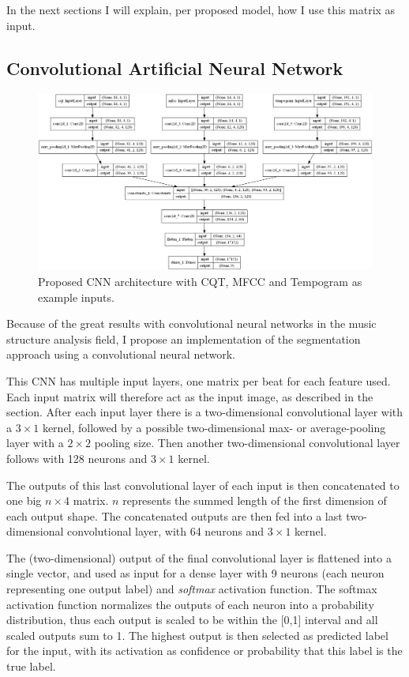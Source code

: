 In the next sections I will explain, per proposed model, how I use this matrix as input.

\subsection[CNN]{Convolutional Artificial Neural Network}
\begin{figure}[t]
    \centering
    \includegraphics[width=1\textwidth]{images/cnn_architecture}
    \caption{Proposed CNN architecture with CQT, MFCC and Tempogram as example inputs.}
    \label{fig:proposed_cnn_architecture}
\end{figure}
Because of the great results with convolutional neural networks in the music structure analysis field, I propose an implementation of the segmentation approach using a convolutional neural network. 

This CNN has multiple input layers, one matrix per beat for each feature used. Each input matrix will therefore act as the input image, as described in the  section. After each input layer there is a two-dimensional convolutional layer with a $3\times1$ kernel, followed by a possible two-dimensional max- or average-pooling layer with a $2\times2$ pooling size. Then another two-dimensional convolutional layer follows with 128 neurons and $3\times1$ kernel.

The outputs of this last convolutional layer of each input is then concatenated to one big $n\times4$ matrix. $n$ represents the summed length of the first dimension of each output shape. The concatenated outputs are then fed into a last two-dimensional convolutional layer, with 64 neurons and $3\times1$ kernel.

The (two-dimensional) output of the final convolutional layer is flattened into a single vector, and used as input for a dense layer with 9 neurons (each neuron representing one output label) and \textit{softmax} activation function. The softmax activation function normalizes the outputs of each neuron into a probability distribution, thus each output is scaled to be within the [0,1] interval and all scaled outputs sum to 1. The highest output is then selected as predicted label for the input, with its activation as confidence or probability that this label is the true label.

